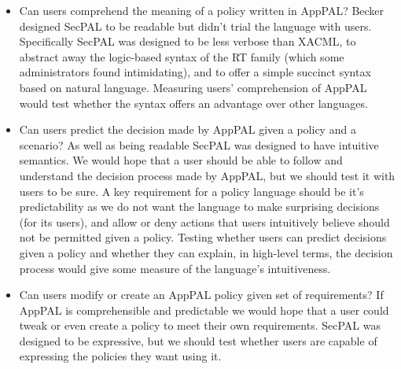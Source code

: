 \documentclass[thesis.tex]{subfiles}
\begin{document}
\begin{itemize}
\item Can users comprehend the meaning of a policy written in AppPAL? Becker
  designed SecPAL to be readable but didn't trial the language with users.
  Specifically SecPAL was designed to be less verbose than XACML, to abstract away
  the logic-based syntax of the RT family (which some administrators found
  intimidating), and to offer a simple succinct syntax based on natural language.
  Measuring users' comprehension of AppPAL would test whether the syntax offers an
  advantage over other languages.

\item Can users predict the decision made by AppPAL given a policy and a
  scenario? As well as being readable SecPAL was designed to have intuitive
  semantics. We would hope that a user should be able to follow and understand the
  decision process made by AppPAL, but we should test it with users to be sure. A
  key requirement for a policy language should be it's predictability as we do not
  want the language to make surprising decisions (for its users), and allow or
  deny actions that users intuitively believe should not be permitted given a
  policy. Testing whether users can predict decisions given a policy and whether
  they can explain, in high-level terms, the decision process would give some
  measure of the language's intuitiveness.
  
\item Can users modify or create an AppPAL policy given set of requirements? If
  AppPAL is comprehensible and predictable we would hope that a user could tweak
  or even create a policy to meet their own requirements. SecPAL was designed to
  be expressive, but we should test whether users are capable of expressing the
  policies they want using it.
\end{itemize}
\end{document}
